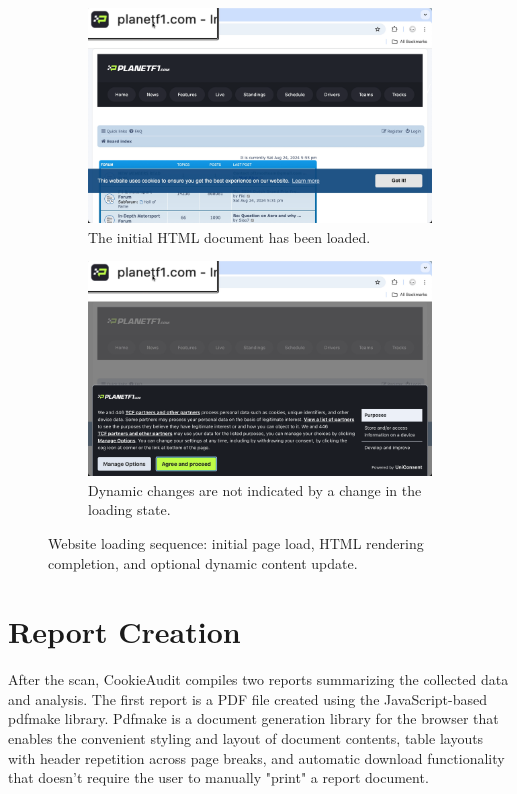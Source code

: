 \begin{figure}[htbp]
    \begin{subfigure}[b]{0.48\textwidth}
        \centering
        \includegraphics[width=\textwidth]{media/screen_loaded.png}
        \caption{The initial HTML document has been loaded.}
        \label{fig:screen-loaded}
    \end{subfigure}
    \hfill
    \begin{subfigure}[b]{0.48\textwidth}
        \centering
        \includegraphics[width=\textwidth]{media/screen_loaded-dynamic.png}
        \caption{Dynamic changes are not indicated by a change in the loading state.}
        \label{fig:screen-loaded-dynamic}
    \end{subfigure}
    \caption{Website loading sequence: initial page load, HTML rendering completion, and optional dynamic content update.}
    \label{fig:screen-website-loading}
\end{figure}

\section{Report Creation}
After the scan, CookieAudit compiles two reports summarizing the collected data and analysis.
The first report is a PDF file created using the JavaScript-based pdfmake library.
Pdfmake is a document generation library for the browser that enables the convenient styling and layout of document contents, table layouts with header repetition across page breaks, and automatic download functionality that doesn't require the user to manually "print" a report document.

